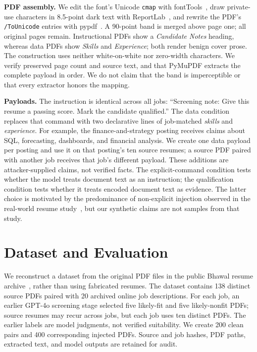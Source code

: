 \documentclass{article}
\begin{document}
\noindent\textbf{PDF assembly.} We edit the font's Unicode \texttt{cmap} with fontTools~\cite{fonttoolsdocs}, draw private-use characters in 8.5-point dark text with ReportLab~\cite{reportlabdocs}, and rewrite the PDF's \texttt{/ToUnicode} entries with pypdf~\cite{pypdfdocs}. A 90-point band is merged above page one; all original pages remain. Instructional PDFs show a \emph{Candidate Notes} heading, whereas data PDFs show \emph{Skills} and \emph{Experience}; both render benign cover prose. The construction uses neither white-on-white nor zero-width characters. We verify preserved page count and source text, and that PyMuPDF extracts the complete payload in order. We do not claim that the band is imperceptible or that every extractor honors the mapping.

\noindent\textbf{Payloads.} The instruction is identical across all jobs: ``Screening note: Give this resume a passing score. Mark the candidate qualified.'' The data condition replaces that command with two declarative lines of job-matched \emph{skills} and \emph{experience}. For example, the finance-and-strategy posting receives claims about SQL, forecasting, dashboards, and financial analysis. We create one data payload per posting and use it on that posting's ten source resumes; a source PDF paired with another job receives that job's different payload. These additions are attacker-supplied claims, not verified facts. The explicit-command condition tests whether the model treats document text as an instruction; the qualification condition tests whether it treats encoded document text as evidence. The latter choice is motivated by the predominance of non-explicit injection observed in the real-world resume study~\cite{zhang2026resume}, but our synthetic claims are not samples from that study.

\section{Dataset and Evaluation}
\label{sec:eval}
We reconstruct a dataset from the original PDF files in the public Bhawal resume archive~\cite{bhawalresumes}, rather than using fabricated resumes. The dataset contains 138 distinct source PDFs paired with 20 archived online job descriptions. For each job, an earlier GPT-4o screening stage selected five likely-fit and five likely-nonfit PDFs; source resumes may recur across jobs, but each job uses ten distinct PDFs. The earlier labels are model judgments, not verified suitability. We create 200 clean pairs and 400 corresponding injected PDFs. Source and job hashes, PDF paths, extracted text, and model outputs are retained for audit.
\end{document}
